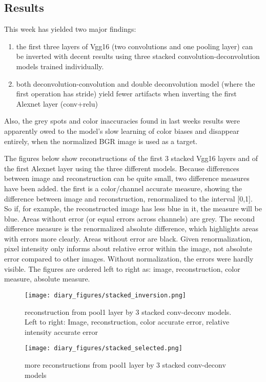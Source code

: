 \documentclass{article}
\begin{document}
\subsection*{Results}

This week has yielded two major findings:
\begin{enumerate}
    \item the first three layers of Vgg16 (two convolutions and one pooling layer) can be inverted with decent results using three stacked convolution-deconvolution models trained individually.
    \item both deconvolution-convolution and double deconvolution model (where the first operation has stride) yield fewer artifacts when inverting the first Alexnet layer (conv+relu)
\end{enumerate}

Also, the grey spots and color inaccuracies found in last weeks results were apparently owed to the model's slow learning of color biases and disappear entirely, when the normalized BGR image is used as a target.

The figures below show reconstructions of the first 3 stacked Vgg16 layers and of the first Alexnet layer using the three different models. Because differences between image and reconstruction can be quite small, two difference measures have been added. the first is a color/channel accurate measure, showing the difference between image and reconstruction, renormalized to the interval [0,1]. So if, for example, the reconstructed image has less blue in it, the measure will be blue. Areas without error (or equal errors across channels) are grey. The second difference measure is the renormalized absolute difference, which highlights areas with errors more clearly. Areas without error are black. Given renormalization,  pixel intensity only informs about relative error within the image, not absolute error compared to other images. Without normalization, the errors were hardly visible. The figures are ordered left to right as: image, reconstruction, color measure, absolute measure.

\begin{figure}
    \centering
    \texttt{[image: diary\_figures/stacked\_inversion.png]}
    \caption{reconstruction from pool1 layer by 3 stacked conv-deconv models. Left to right: Image, reconstruction, color accurate error, relative intensity accurate error}
    \label{fig:stacked_inv1}
\end{figure}

\begin{figure}
    \centering
    \texttt{[image: diary\_figures/stacked\_selected.png]}
    \caption{more reconstructions from pool1 layer by 3 stacked conv-deconv models}
    \label{fig:stacked_inv2}
\end{figure}
\end{document}
